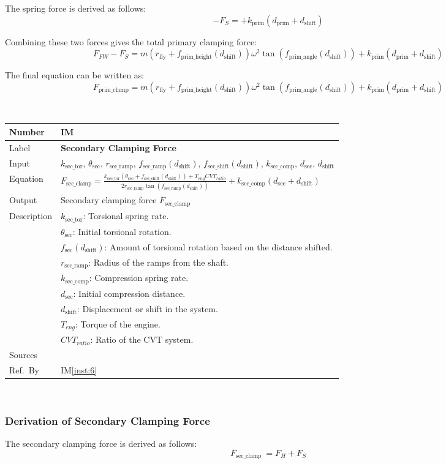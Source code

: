 \documentclass[12pt]{article}
\newcommand{\colAwidth}{0.13\textwidth}
\newcommand{\colBwidth}{0.82\textwidth}
\newcounter{instnum} %
\newcommand{\iref}[1]{IM\ref{#1}}
\newcommand{\definstance}[7] {
~\newline
\noindent
\begin{minipage}{\textwidth}
\renewcommand*{\arraystretch}{1.5}
\begin{tabular}{| p{\colAwidth} | p{\colBwidth}|}
  \hline
  \rowcolor[gray]{0.9}
  Number& IM\refstepcounter{instnum}\theinstnum \label{inst:\theinstnum}\\
  \hline
  Label& \bf #1 \\
  \hline
  Input& #2\\
  \hline
  Equation& #3\\
  \hline
  Output& #4\\
  \hline
  Description& #5 \\
  \hline
  Sources& #6 \\
  \hline
  Ref.\ By & #7\\
  \hline
\end{tabular}
\end{minipage}\\
}
\begin{document}
The spring force is derived as follows: 
\[
-F_S = + k_{\text{prim}} (d_{\text{prim}} + d_{\text{shift}})
\]

Combining these two forces gives the total primary clamping force:
\[
F_{FW} - F_S = m (r_{\text{fly}} + f_{\text{prim\_height}}(d_{\text{shift}}))\omega^2 \tan(f_{\text{prim\_angle}}(d_{\text{shift}})) + k_{\text{prim}} (d_{\text{prim}} + d_{\text{shift}})
\]

The final equation can be written as:
\[
F_{\text{prim\_clamp}} = m (r_{\text{fly}} + f_{\text{prim\_height}}(d_{\text{shift}}))\omega^2 \tan(f_{\text{prim\_angle}}(d_{\text{shift}})) + k_{\text{prim}} (d_{\text{prim}} + d_{\text{shift}})
\]

\definstance
{Secondary Clamping Force}
{$k_{\text{sec\_tor}}$, $\theta_{\text{sec}}$, $r_{\text{sec\_ramp}}$, $f_{\text{sec\_ramp}}(d_{\text{shift}})$, $f_{\text{sec\_shift}}(d_{\text{shift}})$, $k_{\text{sec\_comp}}$, $d_{\text{sec}}$, $d_{\text{shift}}$} %
{$F_{\text{sec\_clamp}} = \frac{k_{\text{sec\_tor}} (\theta_{\text{sec}} + f_{\text{sec\_shift}}(d_{\text{shift}})) + T_{eng} CVT_{ratio}}{2 r_{\text{sec\_ramp}} \tan(f_{\text{sec\_ramp}}(d_{\text{shift}}))} + k_{\text{sec\_comp}} (d_{\text{sec}} + d_{\text{shift}})$} %
{Secondary clamping force $F_{\text{sec\_clamp}}$} %
{$k_{\text{sec\_tor}}$: Torsional spring rate. \\
  &$\theta_{\text{sec}}$: Initial torsional rotation. \\
  &$f_{\text{sec}}(d_{\text{shift}})$: Amount of torsional rotation based on the distance shifted. \\
  &$r_{\text{sec\_ramp}}$: Radius of the ramps from the shaft. \\
  &$k_{\text{sec\_comp}}$: Compression spring rate. \\
  &$d_{\text{sec}}$: Initial compression distance. \\
  &$d_{\text{shift}}$: Displacement or shift in the system. \\
  &$T_{eng}$: Torque of the engine. \\
  &$CVT_{ratio}$: Ratio of the CVT system.
} %
{} %
{\iref{inst:6}}

\subsubsection*{Derivation of Secondary Clamping Force}

The secondary clamping force is derived as follows:
\[
F_{\text{sec\_clamp}}\ = F_H + F_S
\]
\end{document}
